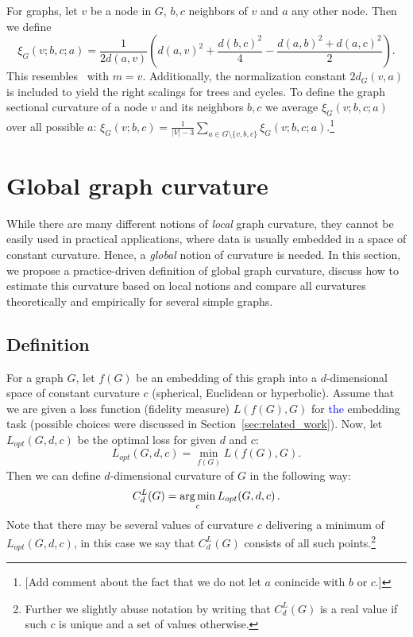 \documentclass{article} %
\newcommand{\ph}[1]{\textcolor{blue}{#1}}
\begin{document}
For graphs, let $v$ be a node in $G$, $b,c$ neighbors of $v$ and $a$ any other node. Then we define
\begin{equation}
\xi_G(v;b,c;a) = \frac{1}{2 d(a,v)} \left( 	d(a,v)^2 + \frac{d(b,c)^2}{4} - \frac{d(a,b)^2 + d(a,c)^2}{2} \right).
\end{equation}
This resembles~ with $m = v$. Additionally, the normalization constant $2d_G(v,a)$ is included to yield the right scalings for trees and cycles.
To define the graph sectional curvature of a node $v$ and its neighbors $b,c$ we average $\xi_G(v;b,c;a)$ over all possible $a$: 
$\xi_G(v; b,c) = \frac{1}{|V|-3} \sum_{a \in G\setminus \{v,b,c\}} \xi_G(v;b,c;a)$.\footnote{[Add comment about the fact that we do not let $a$ conincide with $b$ or $c$.]}


\section{Global graph curvature}

While there are many different notions of \textit{local} graph curvature, they cannot be easily used in practical applications, where data is usually embedded in a space of constant curvature. 
Hence, a \textit{global} notion of curvature is needed. 
In this section, we propose a practice-driven definition of global graph curvature, discuss how to estimate this curvature based on local notions and compare all curvatures theoretically and empirically for several simple graphs.

\subsection{Definition}\label{sec:global_curvature_definition}

For a graph $G$, let $f(G)$ be an embedding of this graph into a $d$-dimensional space of constant curvature $c$ (spherical, Euclidean or hyperbolic). 
Assume that we are given a loss function (fidelity measure) $L(f(G),G)$ for \ph{the} embedding task (possible choices were discussed in Section~\ref{sec:related_work}).
Now, let $L_{opt}(G,d,c)$ be the optimal loss for given $d$ and $c$:
\[
L_{opt}(G,d,c) = \min_{f(G)} L(f(G),G).
\]
Then we can define $d$-dimensional curvature of $G$ in the following way:
\begin{equation}\label{eq:global_curvature}
C_{d}^{L}(G) = \operatorname*{arg\,min}_c L_{opt}(G,d,c)\,.
\end{equation}
Note that there may be several values of curvature $c$ delivering a minimum of $L_{opt}(G,d,c)$, in this case we say that  $C_{d}^{L}(G)$ consists of all such points.\footnote{Further we slightly abuse notation by writing that $C_{d}^{L}(G)$ is a real value if such $c$ is unique and a set of values otherwise.}
\end{document}
